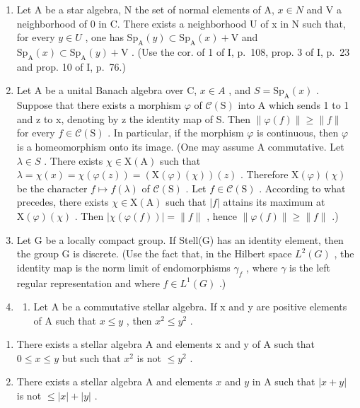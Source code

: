 \begin{enumerate}
\def\labelenumi{\arabic{enumi})}
\setcounter{enumi}{11}
\item
  Let A be a star algebra, N the set of normal elements of A, \(x \in N\) and V a neighborhood of 0 in C. There exists a neighborhood U of x in N such that, for every \(y \in U\) , one has \(\mathrm{Sp}_{\mathrm{A}}(y) \subset \mathrm{Sp}_{\mathrm{A}}(x) + \mathrm{V}\) and \(\mathrm{Sp}_{\mathrm{A}}(x) \subset \mathrm{Sp}_{\mathrm{A}}(y) + \mathrm{V}\) . (Use the cor. of 1 of I, p.~108, prop. 3 of I, p.~23 and prop. 10 of I, p.~76.)
\item
  Let A be a unital Banach algebra over C, \(x \in A\) , and \(S = \mathrm{Sp}_{\mathrm{A}}(x)\) . Suppose that there exists a morphism \(\varphi\) of \(\mathcal{C}(\mathrm{S})\) into A which sends 1 to 1 and z to x, denoting by z the identity map of S. Then \(\|\varphi(f)\| \geqslant \|f\|\) for every \(f \in \mathcal{C}(\mathrm{S})\) . In particular, if the morphism \(\varphi\) is continuous, then \(\varphi\) is a homeomorphism onto its image. (One may assume A commutative. Let \(\lambda \in S\) . There exists \(\chi \in \mathrm{X}(\mathrm{A})\) such that \(\lambda = \chi(x) = \chi(\varphi(z)) = (\mathrm{X}(\varphi)(\chi))(z)\) . Therefore \(\mathrm{X}(\varphi)(\chi)\) be the character \(f \mapsto f(\lambda)\) of \(\mathcal{C}(\mathrm{S})\) . Let \(f \in \mathcal{C}(\mathrm{S})\) . According to what precedes, there exists \(\chi \in \mathrm{X}(\mathrm{A})\) such that \(|f|\) attains its maximum at \(\mathrm{X}(\varphi)(\chi)\) . Then \(|\chi(\varphi(f))| = \|f\|\) , hence \(\|\varphi(f)\| \geqslant \|f\|\) .)
\item
  Let G be a locally compact group. If Stell(G) has an identity element, then the group G is discrete. (Use the fact that, in the Hilbert space \(L^{2}(G)\) , the identity map is the norm limit of endomorphisms \(\gamma_{f}\) , where \(\gamma\) is the left regular representation and where \(f \in L^{1}(G)\) .)
\item
  \begin{enumerate}
  \def\labelenumii{\alph{enumii})}
  \tightlist
  \item
    Let A be a commutative stellar algebra. If x and y are positive elements of A such that \(x \leqslant y\) , then \(x^{2} \leqslant y^{2}\) .
  \end{enumerate}
\end{enumerate}

\begin{enumerate}
\def\labelenumi{\alph{enumi})}
\setcounter{enumi}{1}
\item
  There exists a stellar algebra A and elements x and y of A such that \(0 \leqslant x \leqslant y\) but such that \(x^{2}\) is not \(\leqslant y^{2}\) .
\item
  There exists a stellar algebra A and elements \(x\) and \(y\) in A such that \(|x + y|\) is not \(\leqslant |x| + |y|\) .
\end{enumerate}

